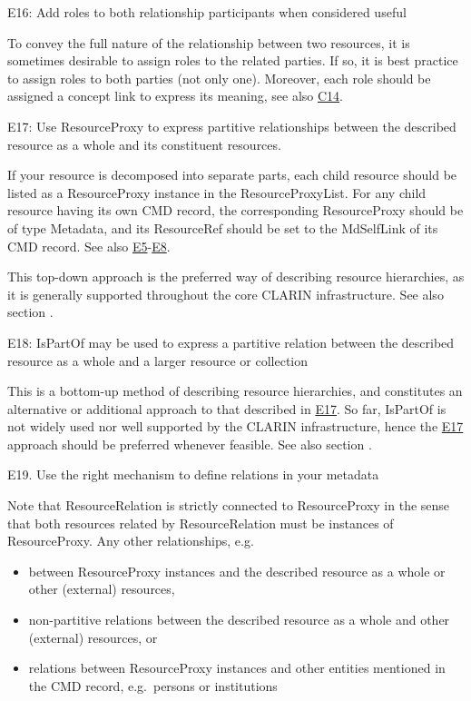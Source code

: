 E16: Add roles to both relationship participants when considered useful


To convey the full nature of the relationship between two resources, it is sometimes desirable to assign roles to the related parties. If so, it is best practice to assign roles to both parties (not only one). Moreover, each role should be assigned a concept link to express its meaning, see also \hyperref[c14]{C14}.

\label{e17}
E17: Use ResourceProxy to express partitive relationships between the described resource as a whole and its constituent resources.


If your resource is decomposed into separate parts, each child resource should be listed as a ResourceProxy instance in the ResourceProxyList. For any child resource having its own CMD record, the corresponding ResourceProxy should be of type Metadata, and its ResourceRef should be set to the MdSelfLink of its CMD record. See also \hyperref[e5]{E5}-\hyperref[e8]{E8}.

This top-down approach is the preferred way of describing resource hierarchies, as it is generally supported throughout the core CLARIN infrastructure. See also section .

E18: IsPartOf may be used to express a partitive relation between the described resource as a whole and a larger resource or collection


This is a bottom-up method of describing resource hierarchies, and constitutes an alternative or additional approach to that described in \hyperref[e17]{E17}. So far, IsPartOf is not widely used nor well supported by the CLARIN infrastructure, hence the \hyperref[e17]{E17} approach should be preferred whenever feasible. See also section .

E19. Use the right mechanism to define relations in your metadata


Note that ResourceRelation is strictly connected to ResourceProxy in the sense that both resources related by ResourceRelation must be instances of ResourceProxy. Any other relationships, e.g.

\begin{itemize}
\tightlist
\item
  between ResourceProxy instances and the described resource as a whole or other (external) resources,
\item
  non-partitive relations between the described resource as a whole and other (external) resources, or
\item
  relations between ResourceProxy instances and other entities mentioned in the CMD record, e.g.~persons or institutions
\end{itemize}

